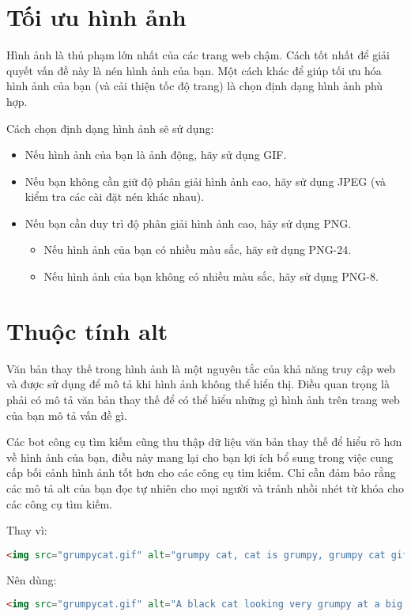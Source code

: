 \section{Tối ưu hình ảnh}
Hình ảnh là thủ phạm lớn nhất của các trang web chậm. Cách tốt nhất để giải quyết vấn đề này là nén hình ảnh của bạn. Một cách khác để giúp tối ưu hóa hình ảnh của bạn (và cải thiện tốc độ trang) là chọn định dạng hình ảnh phù hợp.
\par
Cách chọn định dạng hình ảnh sẽ sử dụng:
\begin{itemize}
	\item Nếu hình ảnh của bạn là ảnh động, hãy sử dụng GIF.
	\item Nếu bạn không cần giữ độ phân giải hình ảnh cao, hãy sử dụng JPEG (và kiểm tra các cài đặt nén khác nhau).
	\item Nếu bạn cần duy trì độ phân giải hình ảnh cao, hãy sử dụng PNG.
	\begin{itemize}
		\item Nếu hình ảnh của bạn có nhiều màu sắc, hãy sử dụng PNG-24.
		\item Nếu hình ảnh của bạn không có nhiều màu sắc, hãy sử dụng PNG-8.
	\end{itemize}
\end{itemize}
\section{Thuộc tính alt}
Văn bản thay thế trong hình ảnh là một nguyên tắc của khả năng truy cập web và được sử dụng để mô tả khi hình ảnh không thể hiển thị. Điều quan trọng là phải có mô tả văn bản thay thế để có thể hiểu những gì hình ảnh trên trang web của bạn mô tả vấn đề gì.
\par
Các bot công cụ tìm kiếm cũng thu thập dữ liệu văn bản thay thế để hiểu rõ hơn về hình ảnh của bạn, điều này mang lại cho bạn lợi ích bổ sung trong việc cung cấp bối cảnh hình ảnh tốt hơn cho các công cụ tìm kiếm. Chỉ cần đảm bảo rằng các mô tả alt của bạn đọc tự nhiên cho mọi người và tránh nhồi nhét từ khóa cho các công cụ tìm kiếm.
\par
Thay vì:
\begin{lstlisting}[language=html]
<img src="grumpycat.gif" alt="grumpy cat, cat is grumpy, grumpy cat gif">
\end{lstlisting}
\par
Nên dùng:
\begin{lstlisting}[language=html]
<img src="grumpycat.gif" alt="A black cat looking very grumpy at a big spotted dog">
\end{lstlisting}
